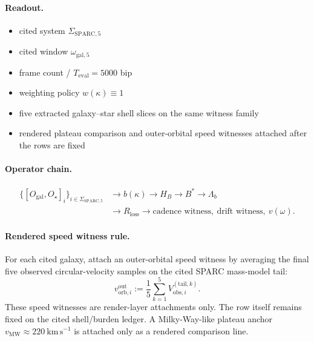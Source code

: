 \paragraph{Readout.}
\begin{itemize}
\item cited system $\Sigma_{\mathrm{SPARC},5}$
\item cited window $\omega_{\mathrm{gal},5}$
\item frame count / $T_{\mathrm{eval}}=5000$ bip
\item weighting policy $w(\kappa)\equiv 1$
\item five extracted galaxy--star shell slices on the same witness family
\item rendered plateau comparison and outer-orbital speed witnesses attached after the rows are fixed
\end{itemize}

\paragraph{Operator chain.}
\[
\begin{aligned}
\{[O_{\mathrm{gal}},O_{\star}]_i\}_{i\in\Sigma_{\mathrm{SPARC},5}}
&\to b(\kappa) \to H_B \to B^* \to \Lambda_b \\
&\to R_{\mathrm{loss}} \to \text{cadence witness},\ \text{drift witness},\ v(\omega).
\end{aligned}
\]

\paragraph{Rendered speed witness rule.}
For each cited galaxy, attach an outer-orbital speed witness by averaging the final five observed circular-velocity samples on the cited SPARC mass-model tail:
\[
v^{\mathrm{out}}_{\mathrm{orb},i}
:=
\frac{1}{5}\sum_{k=1}^{5} V^{(\mathrm{tail},k)}_{\mathrm{obs},i}.
\]
These speed witnesses are render-layer attachments only. The row itself remains fixed on the cited shell/burden ledger. A Milky-Way-like plateau anchor $v_{\mathrm{MW}}\approx220\ \mathrm{km\,s^{-1}}$ is attached only as a rendered comparison line.

